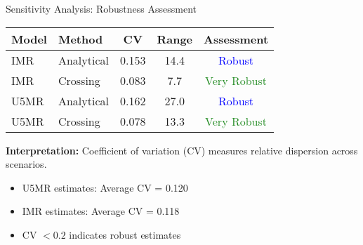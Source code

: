 \documentclass[aspectratio=169]{beamer}\usepackage[]{graphicx}\usepackage[dvipsnames]{xcolor}
\begin{document}
\begin{frame}{Sensitivity Analysis: Robustness Assessment}
\begin{center}
\begin{tabular}{llccc}
\toprule
\textbf{Model} & \textbf{Method} & \textbf{CV} & \textbf{Range} & \textbf{Assessment} \\
\midrule
IMR & Analytical & 0.153 & 14.4 & \textcolor{blue}{Robust} \\
IMR & Crossing & 0.083 & 7.7 & \textcolor{ForestGreen}{Very Robust} \\
U5MR & Analytical & 0.162 & 27.0 & \textcolor{blue}{Robust} \\
U5MR & Crossing & 0.078 & 13.3 & \textcolor{ForestGreen}{Very Robust} \\
\bottomrule
\end{tabular}
\end{center}
\vspace{0.3cm}
\textbf{Interpretation:} Coefficient of variation (CV) measures relative dispersion across scenarios.
\begin{itemize}
\item U5MR estimates: Average CV = 0.120
\item IMR estimates: Average CV = 0.118
\item CV $< 0.2$ indicates robust estimates
\end{itemize}

\end{frame}
\end{document}
